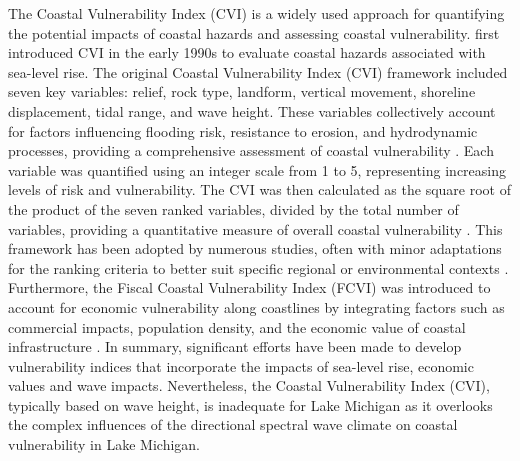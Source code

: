 The Coastal Vulnerability Index (CVI) is a widely used approach for quantifying
the potential impacts of coastal hazards and assessing coastal vulnerability.
\citet{gornitz_global_1991} first introduced CVI in the early 1990s to evaluate
coastal hazards associated with sea-level rise. The original Coastal
Vulnerability Index (CVI) framework included seven key variables: relief, rock
type, landform, vertical movement, shoreline displacement, tidal range, and wave
height. These variables collectively account for factors influencing flooding
risk, resistance to erosion, and hydrodynamic processes, providing a
comprehensive assessment of coastal vulnerability \citep{shaw_sensitivity_1998}.
Each variable was quantified using an integer scale from 1 to 5, representing
increasing levels of risk and vulnerability. The CVI was then calculated as the
square root of the product of the seven ranked variables, divided by the total
number of variables, providing a quantitative measure of overall coastal
vulnerability \citep{koroglu_comparison_2019}. This framework has been adopted
by numerous studies, often with minor adaptations for the ranking criteria to
better suit specific regional or environmental contexts
\citep[\eg][]{royo_rapid_2016,shaw_sensitivity_1998,thieler_national_2000,sekovski2020development,pantusa2022improvement}.
Furthermore, the Fiscal Coastal Vulnerability Index (FCVI) was introduced to
account for economic vulnerability along coastlines by integrating factors such
as commercial impacts, population density, and the economic value of coastal
infrastructure
\citep{kantamaneni_assessing_2018,kantamaneni2016counting,kantamaneni2024vulnerability}.
In summary, significant efforts have been made to develop vulnerability indices
that incorporate the impacts of sea-level rise, economic values and wave
impacts.  Nevertheless, the Coastal Vulnerability Index (CVI), typically based
on wave height, is inadequate for Lake Michigan as it overlooks the complex
influences of the directional spectral wave climate on coastal vulnerability in
Lake Michigan.

